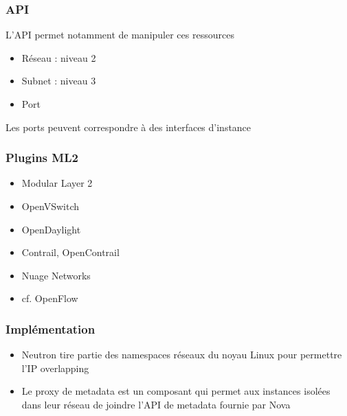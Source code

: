   \begin{frame}
    \frametitle{API}
    L'API permet notamment de manipuler ces ressources
    \begin{itemize}
      \item Réseau : niveau 2
      \item Subnet : niveau 3
      \item Port
    \end{itemize}
    Les ports peuvent correspondre à des interfaces d'instance
  \end{frame}

  \begin{frame}
    \frametitle{Plugins ML2}
    \begin{itemize}
      \item Modular Layer 2
      \item OpenVSwitch
      \item OpenDaylight
      \item Contrail, OpenContrail
      \item Nuage Networks
      \item cf. OpenFlow
    \end{itemize}
  \end{frame}

  \begin{frame}
    \frametitle{Implémentation}
    \begin{itemize}
      \item Neutron tire partie des namespaces réseaux du noyau Linux pour permettre l'IP overlapping
      \item Le proxy de metadata est un composant qui permet aux instances isolées dans leur réseau de joindre l'API de metadata fournie par Nova
    \end{itemize}
  \end{frame}

